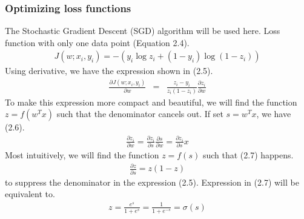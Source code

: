 \subsubsection{Optimizing loss functions}
\hspace{0.5cm}The Stochastic Gradient Descent (SGD) algorithm will be used here. Loss function with only one data point (Equation 2.4).
\begin{align}
	J(w; x_i, y_i) = -(y_i \log {z}_i + (1-y_i) \log (1 - {z}_i))
\end{align}
\hspace{0.5cm}Using derivative, we have the expression shown in (2.5).
\begin{eqnarray}
	\frac{\partial J(w; x_i, y_i)}{\partial w} 
	&=& \frac{z_i - y_i}{z_i(1 - z_i)} \frac{\partial z_i}{\partial w} 
\end{eqnarray}
\hspace{0.5cm}To make this expression more compact and beautiful, we will find the function 
$z = f(w^T x)$ such that the denominator cancels out. If set $s = w^T x$, we have (2.6).
\begin{align}
	\frac{\partial z_i}{\partial w} = \frac{\partial z_i}{\partial s} \frac{\partial s}{\partial w} = \frac{\partial z_i}{\partial s} x  
\end{align}
\hspace{0.5cm}Most intuitively, we will find the function $z = f(s)$ such that (2.7) happens.
\begin{align}
	\frac{\partial z}{\partial s} = z(1 - z)
\end{align}
to suppress the denominator in the expression (2.5). Expression in (2.7) will be equivalent to.
\begin{align}
	z = \frac{e^s}{1 +e^s} = \frac{1}{1 + e^{-s}} = \sigma(s) 
\end{align}

